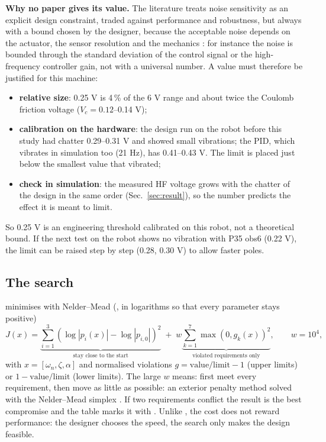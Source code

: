 \documentclass[10pt,a4paper]{article}
\newcommand{\code}[1]{\texttt{\detokenize{#1}}}
\begin{document}
\textbf{Why no paper gives its value.} The literature treats noise sensitivity as an explicit design constraint, traded
against performance and robustness, but always with a bound chosen by the designer, because the acceptable noise depends
on the actuator, the sensor resolution and the mechanics \cite{Garpinger2014,RomeroSegovia2014,AstromHagglund2006}: for
instance the noise is bounded through the standard deviation of the control signal or the high-frequency controller gain,
not with a universal number. A value must therefore be justified for this machine:
\begin{itemize}
  \item \textbf{relative size}: 0.25 V is 4\,\% of the 6 V range and about twice the Coulomb friction voltage
        ($V_c=0.12$--0.14 V);
  \item \textbf{calibration on the hardware}: the design run on the robot before this study had chatter 0.29--0.31 V and
        showed small vibrations; the PID, which vibrates in simulation too (21 Hz), has 0.41--0.43 V. The limit is placed
        just below the smallest value that vibrated;
  \item \textbf{check in simulation}: the measured HF voltage grows with the chatter of the design in the same order
        (Sec.~\ref{sec:result}), so the number predicts the effect it is meant to limit.
\end{itemize}
So 0.25 V is an engineering threshold calibrated on this robot, not a theoretical bound. If the next test on the robot
shows no vibration with P35 obs6 (0.22 V), the limit can be raised step by step (0.28, 0.30 V) to allow faster poles.

\subsection{The search}\label{sec:search}
\code{pp_search.m} minimises with Nelder--Mead (\code{fminsearch}, in logarithms so that every parameter stays positive)
\begin{equation}
  J(x)=\underbrace{\sum_{i=1}^{3}\left(\log|p_i(x)|-\log|p_{i,0}|\right)^2}_{\text{stay close to the start}}
  \;+\;w\underbrace{\sum_{k=1}^{7}\max\left(0,g_k(x)\right)^2}_{\text{violated requirements only}},\qquad w=10^4,
\end{equation}
with $x=[\omega_n,\zeta,\alpha]$ and normalised violations $g=\text{value}/\text{limit}-1$ (upper limits) or
$1-\text{value}/\text{limit}$ (lower limits). The large $w$ means: first meet every requirement, then move as little as
possible: an exterior penalty method \cite{NocedalWright2006} solved with the Nelder--Mead simplex
\cite{NelderMead1965,Lagarias1998}. If two requirements conflict the result is the best compromise and the table marks it
with \code{*}. Unlike \cite{Panagopoulos2002}, the cost does not reward performance: the designer chooses the speed, the
search only makes the design feasible.
\end{document}
